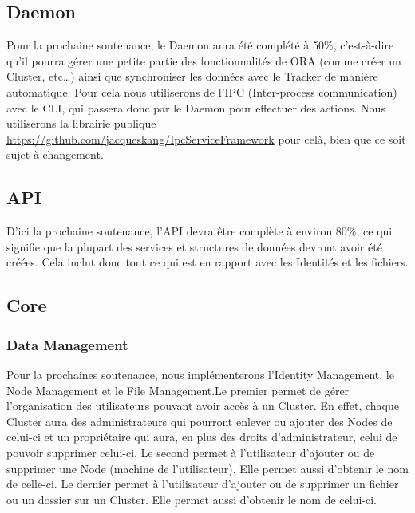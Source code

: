 \documentclass[11pt, a4paper]{report}
\newcommand*{\surl}[1]{{\bodyfont\color{clearocean}\selectfont\url{#1}}}
\begin{document}
    \subsection{Daemon}
      Pour la prochaine soutenance, le Daemon aura été complété à 50\%, c'est-à-dire qu'il pourra gérer une petite partie des fonctionnalités de ORA (comme créer un Cluster, etc\ldots) ainsi que synchroniser les données avec le Tracker de manière automatique. Pour cela nous utiliserons de l'IPC (Inter-process communication) avec le CLI, qui passera donc par le Daemon pour effectuer des actions. Nous utiliserons la librairie publique \surl{https://github.com/jacqueskang/IpcServiceFramework} pour celà, bien que ce soit sujet à changement.
    
    \subsection{API}
      D'ici la prochaine soutenance, l'API devra être complète à environ 80\%, ce qui signifie que la plupart des services et structures de données devront avoir été créées. Cela inclut donc tout ce qui est en rapport avec les Identités et les fichiers.
    
    \subsection{Core}
    
      \subsubsection{Data Management}
        Pour la prochaines soutenance, nous implémenterons l'Identity Management, le Node Management et le File Management.\newline Le premier permet de gérer l'organisation des utilisateurs pouvant avoir accès à un Cluster. En effet, chaque Cluster aura des administrateurs qui pourront enlever ou ajouter des Nodes de celui-ci et un propriétaire qui aura, en plus des droits d'administrateur, celui de pouvoir supprimer celui-ci.\newline
        Le second permet à l'utilisateur d'ajouter ou de supprimer une Node (machine de l'utilisateur). Elle permet aussi d'obtenir le nom de celle-ci.\newline
        Le dernier permet à l'utilisateur d'ajouter ou de supprimer un fichier ou un dossier sur un Cluster. Elle permet aussi d'obtenir le nom de celui-ci.
        
\end{document}
